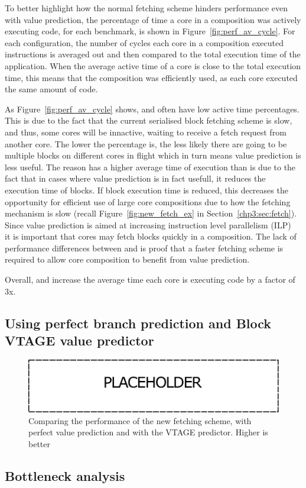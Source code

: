 To better highlight how the normal fetching scheme hinders performance even with value prediction, the percentage of time a core in a composition was actively executing code, for each benchmark, is shown in Figure~\ref{fig:perf_av_cycle}.
For each configuration, the number of cycles each core in a composition executed instructions is averaged out and then compared to the total execution time of the application.
When the average active time of a core is close to the total execution time, this means that the composition was efficiently used, as each core executed the same amount of code.

As Figure~\ref{fig:perf_av_cycle} shows, \novp{} and \vp{} often have low active time percentages.
This is due to the fact that the current serialised block fetching scheme is slow, and thus, some cores will be innactive, waiting to receive a fetch request from another core.
The lower the percentage is, the less likely there are going to be multiple blocks on different cores in flight which in turn means value prediction is less useful.
The reason \novp{} has a higher average time of execution than \vp{} is due to the fact that in cases where value prediction is in fact usefull, it reduces the execution time of blocks.
If block execution time is reduced, this decreases the opportunity for efficient use of large core compositions due to how the fetching mechanism is slow (recall Figure~\ref{fig:new_fetch_ex} in Section~\ref{chp3:sec:fetch}).
Since value prediction is aimed at increasing instruction level parallelism (ILP)~\cite{peraisBeBop2015} it is important that cores may fetch blocks quickly in a composition.
The lack of performance differences between \novp{} and \vp{} is proof that a faster fetching scheme is required to allow core composition to benefit from value prediction.

Overall, \nfnovp{} and \nfvp{} increase the average time each core is executing code by a factor of 3x.



\subsection{Using perfect branch prediction and Block VTAGE value predictor}
\begin{figure}[t]
    \centering
    \includegraphics[width=1\textwidth]{chapter3/graphics/wip.pdf}
    \caption{Comparing the performance of the new fetching scheme, with perfect value prediction and with the VTAGE predictor. Higher is better}
    \label{fig:perf_pred}
	\vspace{1em}
\end{figure}

\subsection{Bottleneck analysis}